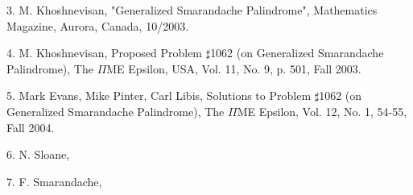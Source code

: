 \documentclass[12pt]{article}
\begin{document}
3. M. Khoshnevisan, "Generalized Smarandache Palindrome", Mathematics Magazine, Aurora, Canada, 10/2003.

4. M. Khoshnevisan, Proposed Problem $\sharp$1062 (on Generalized Smarandache Palindrome), The $\Pi$ME Epsilon, USA, Vol. 11, No. 9, p. 501, Fall 2003.

5. Mark Evans, Mike Pinter, Carl Libis, Solutions to Problem $\sharp$1062 (on Generalized Smarandache Palindrome), The $\Pi$ME Epsilon, Vol. 12, No. 1, 54-55, Fall 2004.

6. N. Sloane, 

7. F. Smarandache, 

\end{document}
